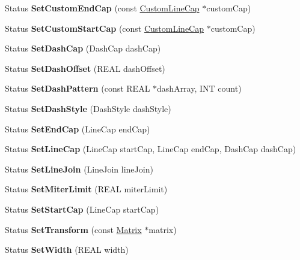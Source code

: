 \begin{DoxyCompactItemize}
Status {\bfseries Set\+Custom\+End\+Cap} (const \hyperlink{class_custom_line_cap}{Custom\+Line\+Cap} $\ast$custom\+Cap)
\item 
\mbox{\label{class_pen_a29b98ead868dc643e998d94d59134028}} 
Status {\bfseries Set\+Custom\+Start\+Cap} (const \hyperlink{class_custom_line_cap}{Custom\+Line\+Cap} $\ast$custom\+Cap)
\item 
\mbox{\label{class_pen_ab1c7466debeec15d8918c4dacdfc9e5b}} 
Status {\bfseries Set\+Dash\+Cap} (Dash\+Cap dash\+Cap)
\item 
\mbox{\label{class_pen_aecd7d4543873b652bce8b61134ee32a1}} 
Status {\bfseries Set\+Dash\+Offset} (R\+E\+AL dash\+Offset)
\item 
\mbox{\label{class_pen_a47c365e33b512ae4d9bdf3580a7f1da6}} 
Status {\bfseries Set\+Dash\+Pattern} (const R\+E\+AL $\ast$dash\+Array, I\+NT count)
\item 
\mbox{\label{class_pen_aa7ccf3734109134e830ae7db1dbbf3d8}} 
Status {\bfseries Set\+Dash\+Style} (Dash\+Style dash\+Style)
\item 
\mbox{\label{class_pen_aedacc5e55a30e021156823c31f107a10}} 
Status {\bfseries Set\+End\+Cap} (Line\+Cap end\+Cap)
\item 
\mbox{\label{class_pen_aa3df0defa4eec61249beffa1583eae7f}} 
Status {\bfseries Set\+Line\+Cap} (Line\+Cap start\+Cap, Line\+Cap end\+Cap, Dash\+Cap dash\+Cap)
\item 
\mbox{\label{class_pen_afed9c45658b9b8dfcd869dc1ed67e1ea}} 
Status {\bfseries Set\+Line\+Join} (Line\+Join line\+Join)
\item 
\mbox{\label{class_pen_ab017c1200c6a731468163b28f97ee9df}} 
Status {\bfseries Set\+Miter\+Limit} (R\+E\+AL miter\+Limit)
\item 
\mbox{\label{class_pen_a471342f29fadd0d6de2aa2ed0d4e3533}} 
Status {\bfseries Set\+Start\+Cap} (Line\+Cap start\+Cap)
\item 
\mbox{\label{class_pen_a800d877376e7742a4669c60ced7bcbdf}} 
Status {\bfseries Set\+Transform} (const \hyperlink{class_matrix}{Matrix} $\ast$matrix)
\item 
\mbox{\label{class_pen_a169178d6a277923e8d6d915378ed130e}} 
Status {\bfseries Set\+Width} (R\+E\+AL width)
\end{DoxyCompactItemize}
